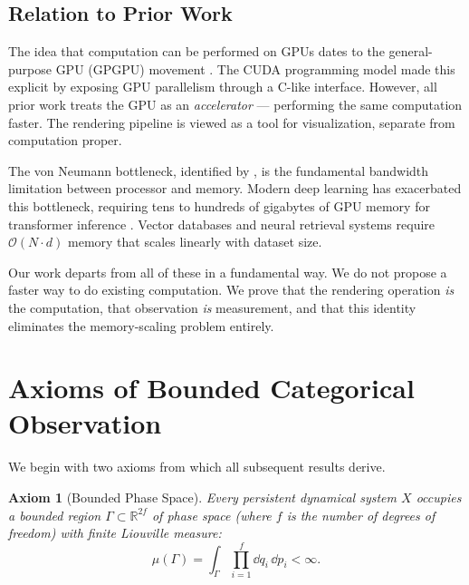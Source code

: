 \documentclass[11pt,twocolumn,a4paper]{article}
\newtheorem{axiom}{Axiom}
\newcommand{\BigO}{\mathcal{O}}
\newcommand{\R}{\mathbb{R}}
\begin{document}

\subsection{Relation to Prior Work}

The idea that computation can be performed on GPUs dates to the
general-purpose GPU (GPGPU) movement \citep{owens2008,harris2002}.
The CUDA programming model \citep{nickolls2008} made this explicit
by exposing GPU parallelism through a C-like interface. However,
all prior work treats the GPU as an \emph{accelerator} --- performing
the same computation faster. The rendering pipeline is viewed as
a tool for visualization, separate from computation proper.

The von Neumann bottleneck, identified by \citet{backus1978}, is the
fundamental bandwidth limitation between processor and memory. Modern
deep learning has exacerbated this bottleneck, requiring tens to
hundreds of gigabytes of GPU memory for transformer inference
\citep{vaswani2017,sze2017}. Vector databases
\citep{johnson2019,milvus2021} and neural retrieval systems
\citep{karpukhin2020,khattab2020} require $\BigO(N \cdot d)$ memory
that scales linearly with dataset size.

Our work departs from all of these in a fundamental way. We do not
propose a faster way to do existing computation. We prove that the
rendering operation \emph{is} the computation, that observation
\emph{is} measurement, and that this identity eliminates the
memory-scaling problem entirely.


\section{Axioms of Bounded Categorical Observation}
\label{sec:axioms}

We begin with two axioms from which all subsequent results derive.

\begin{axiom}[Bounded Phase Space]
\label{ax:bounded}
Every persistent dynamical system $X$ occupies a bounded region
$\Gamma \subset \R^{2f}$ of phase space (where $f$ is the number of
degrees of freedom) with finite Liouville measure:
\begin{equation}
\mu(\Gamma) = \int_{\Gamma} \prod_{i=1}^{f}
  \dd{q_i}\,\dd{p_i} < \infty.
\label{eq:liouville-finite}
\end{equation}
\end{axiom}
\end{document}
